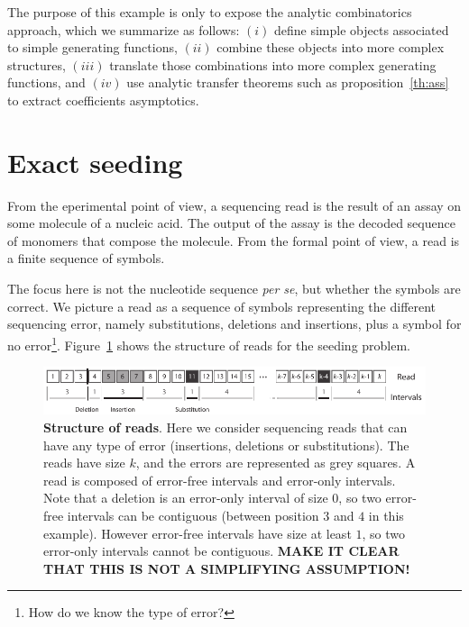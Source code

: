 \documentclass{article}
\begin{document}
The purpose of this example is only to expose the analytic combinatorics
approach, which we summarize as follows: $(i)$ define simple objects
associated to simple generating functions, $(ii)$ combine these objects
into more complex structures, $(iii)$ translate those combinations into
more complex generating functions, and $(iv)$ use analytic transfer
theorems such as proposition~\ref{th:ass} to extract coefficients
asymptotics.











\section{Exact seeding}

From the eperimental point of view, a sequencing read is the result of an
assay on some molecule of a nucleic acid. The output of the assay is the
decoded sequence of monomers that compose the molecule. From the formal
point of view, a read is a finite sequence of symbols.

The focus here is not the nucleotide sequence \textit{per se}, but whether
the symbols are correct. We picture a read as a sequence of symbols
representing the different sequencing error, namely substitutions,
deletions and insertions, plus a symbol for no error\footnote{How do we
know the type of error?}. Figure~\ref{fig:sketchseed} shows the structure
of reads for the seeding problem.

\begin{figure}[h]
\centering
\includegraphics[scale=0.88]{sketch_seeding.pdf}
\caption{\textbf{Structure of reads}. Here we consider sequencing reads
that can have any type of error (insertions, deletions or substitutions).
The reads have size $k$, and the errors are represented as grey squares. A
read is composed of error-free intervals and error-only intervals. Note
that a deletion is an error-only interval of size $0$, so two error-free
intervals can be contiguous (between position $3$ and $4$ in this
example). However error-free intervals have size at least $1$, so two
error-only intervals cannot be contiguous. \textbf{MAKE IT CLEAR THAT
THIS IS NOT A SIMPLIFYING ASSUMPTION!}}
\label{fig:sketchseed}
\end{figure}
\end{document}
